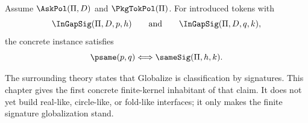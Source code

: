 \begin{corollary}
\label{cor:globalize-equals-signature-classification-concrete}
Assume \(\AskPol(\Pi,D)\) and \(\PkgTokPol(\Pi)\). For introduced tokens with
$$
  \InGapSig(\Pi,D,p,h)
  \qquad\text{and}\qquad
  \InGapSig(\Pi,D,q,k),
$$
the concrete instance satisfies
$$
  \psame(p,q)\Longleftrightarrow \sameSig(\Pi,h,k).
$$
\end{corollary}

\begin{remark}
The surrounding theory states that Globalize is classification by signatures. This chapter gives the first concrete finite-kernel inhabitant of that claim. It does not yet build real-like, circle-like, or fold-like interfaces; it only makes the finite signature globalization stand.
\end{remark}

